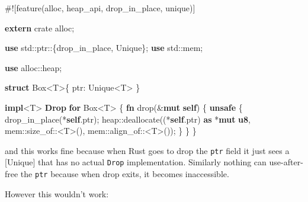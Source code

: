 \documentclass[a4paper,]{book}
\newenvironment{Shaded}{\begin{snugshade}}{\end{snugshade}}
\newcommand{\KeywordTok}[1]{\textcolor[rgb]{0.13,0.29,0.53}{\textbf{{#1}}}}
\newcommand{\NormalTok}[1]{{#1}}
\begin{document}
\begin{Shaded}
\begin{Highlighting}[]
\NormalTok{#![feature(alloc, heap_api, drop_in_place, unique)]}

\KeywordTok{extern} \NormalTok{crate alloc;}

\KeywordTok{use} \NormalTok{std::ptr::\{drop_in_place, Unique\};}
\KeywordTok{use} \NormalTok{std::mem;}

\KeywordTok{use} \NormalTok{alloc::heap;}

\KeywordTok{struct} \NormalTok{Box<T>\{ ptr: Unique<T> \}}

\KeywordTok{impl}\NormalTok{<T> }\KeywordTok{Drop} \KeywordTok{for} \NormalTok{Box<T> \{}
    \KeywordTok{fn} \NormalTok{drop(&}\KeywordTok{mut} \KeywordTok{self}\NormalTok{) \{}
        \KeywordTok{unsafe} \NormalTok{\{}
            \NormalTok{drop_in_place(*}\KeywordTok{self}\NormalTok{.ptr);}
            \NormalTok{heap::deallocate((*}\KeywordTok{self}\NormalTok{.ptr) }\KeywordTok{as} \NormalTok{*}\KeywordTok{mut} \KeywordTok{u8}\NormalTok{,}
                             \NormalTok{mem::size_of::<T>(),}
                             \NormalTok{mem::align_of::<T>());}
        \NormalTok{\}}
    \NormalTok{\}}
\NormalTok{\}}
\end{Highlighting}
\end{Shaded}

and this works fine because when Rust goes to drop the \texttt{ptr}
field it just sees a {[}Unique{]} that has no actual \texttt{Drop}
implementation. Similarly nothing can use-after-free the \texttt{ptr}
because when drop exits, it becomes inaccessible.

However this wouldn't work:
\end{document}
